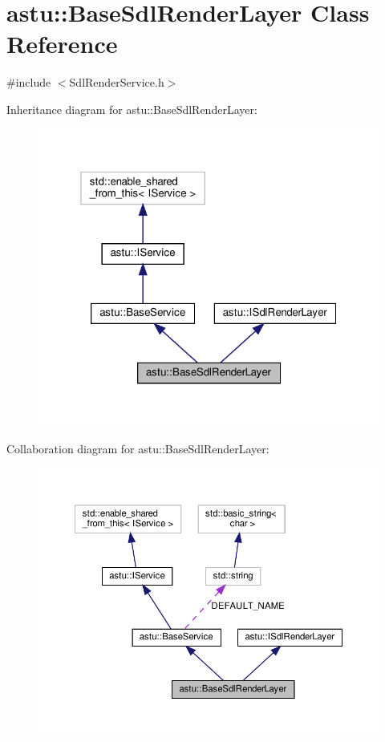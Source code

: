 \hypertarget{classastu_1_1BaseSdlRenderLayer}{}\section{astu\+:\+:Base\+Sdl\+Render\+Layer Class Reference}
\label{classastu_1_1BaseSdlRenderLayer}


{\ttfamily \#include $<$Sdl\+Render\+Service.\+h$>$}



Inheritance diagram for astu\+:\+:Base\+Sdl\+Render\+Layer\+:\nopagebreak
\begin{figure}[H]
\begin{center}
\leavevmode
\includegraphics[width=319pt]{classastu_1_1BaseSdlRenderLayer__inherit__graph}
\end{center}
\end{figure}


Collaboration diagram for astu\+:\+:Base\+Sdl\+Render\+Layer\+:\nopagebreak
\begin{figure}[H]
\begin{center}
\leavevmode
\includegraphics[width=350pt]{classastu_1_1BaseSdlRenderLayer__coll__graph}
\end{center}
\end{figure}
